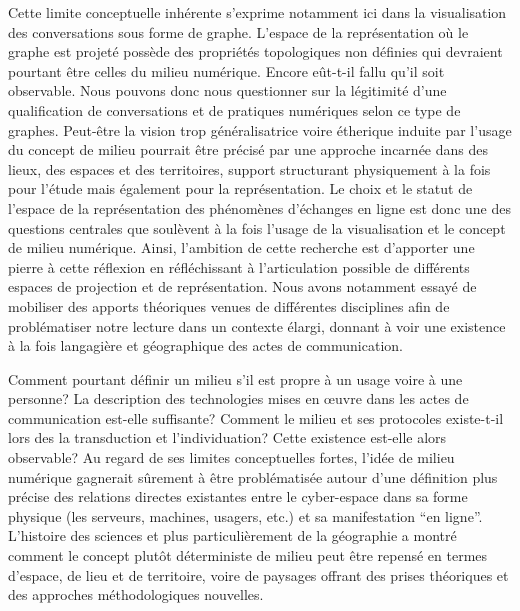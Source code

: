 Cette limite conceptuelle inhérente s{\textquoteright}exprime notamment ici dans la visualisation des conversations sous forme de graphe. L'espace de la représentation où le graphe est projeté possède des propriétés topologiques non définies qui devraient pourtant être celles du milieu numérique. Encore eût-t-il fallu qu'il soit observable. Nous pouvons donc nous questionner sur la légitimité d{\textquoteright}une qualification de conversations et de pratiques numériques selon ce type de graphes. Peut-être la vision trop généralisatrice voire étherique induite par l{\textquoteright}usage du concept de milieu pourrait être précisé par une approche incarnée dans des lieux, des espaces et des territoires, support structurant physiquement à la fois pour l{\textquoteright}étude mais également pour la représentation. Le choix et le statut de l'espace de la représentation des phénomènes d'échanges en ligne est donc une des questions centrales que soulèvent à la fois l'usage de la visualisation et le concept de milieu numérique. Ainsi, l'ambition de cette recherche est d'apporter une pierre à cette réflexion en réfléchissant à l'articulation possible de différents espaces de projection et de représentation. Nous avons notamment essayé de mobiliser des apports théoriques venues de différentes disciplines afin de problématiser notre lecture dans un contexte élargi, donnant à voir une existence à la fois langagière et géographique des actes de communication. 

Comment pourtant définir un milieu s{\textquoteright}il est propre à un usage voire à une personne? La description des technologies mises en {\oe}uvre dans les actes de communication est-elle suffisante? Comment le milieu et ses protocoles existe-t-il lors des la transduction et l{\textquoteright}individuation? Cette existence est-elle alors observable? Au regard de ses limites conceptuelles fortes, l{\textquoteright}idée de milieu numérique gagnerait s\^urement à être problématisée autour d{\textquoteright}une définition plus précise des relations directes existantes entre le cyber-espace dans sa forme physique (les serveurs, machines, usagers, etc.) et sa manifestation {\textquotedblleft}en ligne{\textquotedblright}. L{\textquoteright}histoire des sciences et plus particulièrement de la géographie a montré comment le concept plut\^ot déterministe de milieu peut être repensé en termes d{\textquoteright}espace, de lieu et de territoire, voire de paysages offrant des prises théoriques et des approches méthodologiques nouvelles. 

